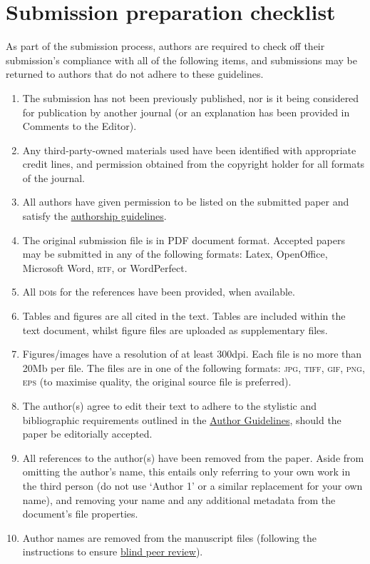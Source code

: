 \documentclass[charis,linguex]{glossa}
\begin{document}
\section{Submission preparation checklist}

As part of the submission process, authors are required to check off their submission's compliance with all of the following items, and submissions may be returned to authors that do not adhere to these guidelines.

\begin{enumerate}[label=\arabic*.]
\item The submission has not been previously published, nor is it being considered for publication by another journal (or an explanation has been provided in Comments to the Editor).
\item Any third-party-owned materials used have been identified with appropriate credit lines, and permission obtained from the copyright holder for all formats of the journal.
\item All authors have given permission to be listed on the submitted paper and satisfy the \href{http://glossa.ubiquitypress.com/about/authorship/}{authorship guidelines}. 
\item The original submission file is in PDF document format. Accepted papers may be submitted in any of the following formats: Latex, OpenOffice, Microsoft Word, \textsc{rtf}, or WordPerfect.
\item All \textsc{doi}s for the references have been provided, when available.
\item Tables and figures are all cited in the text. Tables are included within the text document, whilst figure files are uploaded as supplementary files.
\item Figures/images have a resolution of at least 300dpi. Each file is no more than 20Mb per file. The files are in one of the following formats: \textsc{jpg, tiff, gif, png, eps} (to maximise quality, the original source file is preferred).
\item The author(s) agree to edit their text to adhere to the stylistic and bibliographic requirements outlined in the \href{https://www.glossa-journal.org/about/submissions#authorGuidelines}{Author Guidelines}, should the paper be editorially accepted.
\item All references to the author(s) have been removed from the paper. Aside from omitting the author’s name, this entails only referring to your own work in the third person (do not use `Author 1’ or a similar replacement for your own name), and removing your name and any additional metadata from the document’s file properties.
\item Author names are removed from the manuscript files (following the instructions to ensure \href{https://www.glossa-journal.org/help/view/editorial/topic/000044}{blind peer review}).

\end{enumerate}
\end{document}
